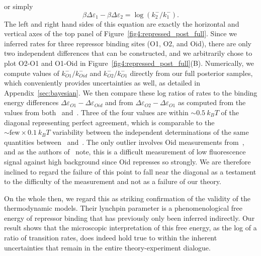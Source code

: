 or simply
\begin{equation}
\beta\Delta\varepsilon_1 - \beta\Delta\varepsilon_2
= \log(k_2^-/k_1^-).
\end{equation}
The left and right hand sides of this equation are exactly the horizontal and
vertical axes of the top panel of Figure~\ref{fig4:repressed_post_full}. Since
we inferred rates for three repressor binding sites (O1, O2, and Oid), there are
only two independent differences that can be constructed, and we arbitrarily
chose to plot O2-O1 and O1-Oid in Figure~\ref{fig4:repressed_post_full}(B).
Numerically, we compute values of $k_{O1}^- / k_{Oid}^-$ and $k_{O2}^- /
k_{O1}^-$ directly from our full posterior samples, which conveniently provides
uncertainties as well, as detailed in Appendix~\ref{sec:bayesian}.
We then compare these log ratios of rates to the
binding energy differences $\Delta\varepsilon_{O1} - \Delta\varepsilon_{Oid}$
and from $\Delta\varepsilon_{O2} - \Delta\varepsilon_{O1}$ as computed from the
values from both~\cite{Garcia2011a} and~\cite{Razo-Mejia2018}. Three of the four
values are within $\sim0.5~k_BT$ of the diagonal representing perfect agreement,
which is comparable to the $\sim\text{few}\times0.1~k_BT$ variability between
the independent determinations of the same quantities between~\cite{Garcia2011a}
and~\cite{Razo-Mejia2018}. The only outlier involves Oid measurements
from~\cite{Razo-Mejia2018}, and as the authors of~\cite{Razo-Mejia2018} note,
this is a difficult measurement of low fluorescence signal against high
background since Oid represses so strongly. We are therefore inclined to regard
the failure of this point to fall near the diagonal as a testament to the
difficulty of the measurement and not as a failure of our theory.

On the whole then, we regard this as striking confirmation of the validity of
the thermodynamic models. Their lynchpin parameter is a phenomenological free
energy of repressor binding that has previously only been inferred indirectly.
Our result shows that the microscopic interpretation of this free energy, as the
log of a ratio of transition rates, does indeed hold true to within the inherent
uncertainties that remain in the entire theory-experiment dialogue.

